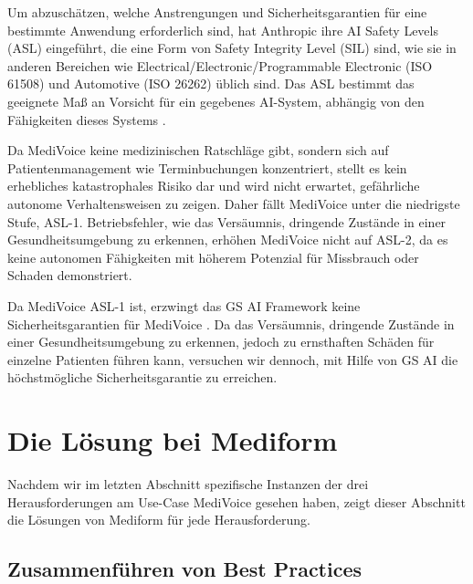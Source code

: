 \documentclass[twocolumn]{article}
\begin{document}
Um abzuschätzen, welche Anstrengungen und Sicherheitsgarantien für eine bestimmte Anwendung erforderlich sind, hat Anthropic ihre AI Safety Levels (ASL) eingeführt, die eine Form von Safety Integrity Level (SIL) sind, wie sie in anderen Bereichen wie Electrical/Electronic/Programmable Electronic (ISO 61508) und Automotive (ISO 26262) üblich sind. Das ASL bestimmt das geeignete Maß an Vorsicht für ein gegebenes AI-System, abhängig von den Fähigkeiten dieses Systems \cite{Anthropic23, Anthropic23b}.

Da MediVoice keine medizinischen Ratschläge gibt, sondern sich auf Patientenmanagement wie Terminbuchungen konzentriert, stellt es kein erhebliches katastrophales Risiko dar und wird nicht erwartet, gefährliche autonome Verhaltensweisen zu zeigen. Daher fällt MediVoice unter die niedrigste Stufe, ASL-1. Betriebsfehler, wie das Versäumnis, dringende Zustände in einer Gesundheitsumgebung zu erkennen, erhöhen MediVoice nicht auf ASL-2, da es keine autonomen Fähigkeiten mit höherem Potenzial für Missbrauch oder Schaden demonstriert.

Da MediVoice ASL-1 ist, erzwingt das GS AI Framework keine Sicherheitsgarantien für MediVoice \cite{Dalrymple24}. Da das Versäumnis, dringende Zustände in einer Gesundheitsumgebung zu erkennen, jedoch zu ernsthaften Schäden für einzelne Patienten führen kann, versuchen wir dennoch, mit Hilfe von GS AI die höchstmögliche Sicherheitsgarantie zu erreichen.

\section{Die Lösung bei Mediform}

Nachdem wir im letzten Abschnitt spezifische Instanzen der drei Herausforderungen am Use-Case MediVoice gesehen haben, zeigt dieser Abschnitt die Lösungen von Mediform für jede Herausforderung.

\subsection{Zusammenführen von Best Practices}
\end{document}
